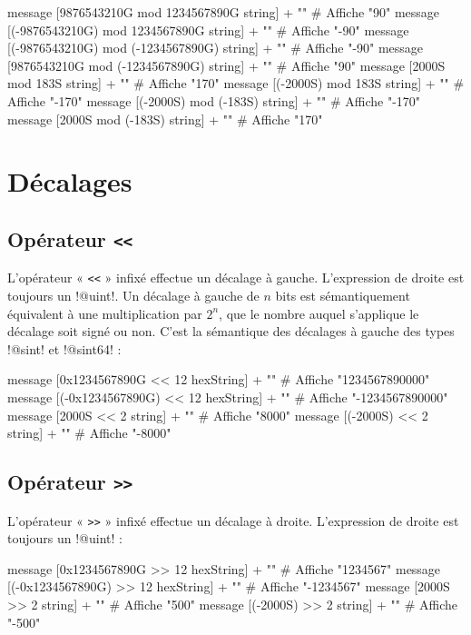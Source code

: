 \begin{galgas}
  message [9876543210G mod 1234567890G string] + "\n" # Affiche "90"
  message [(-9876543210G) mod 1234567890G string] + "\n" # Affiche "-90"
  message [(-9876543210G) mod (-1234567890G) string] + "\n"  # Affiche "-90"
  message [9876543210G mod (-1234567890G) string] + "\n"  # Affiche "90"
  message [2000S mod 183S string] + "\n" # Affiche "170"
  message [(-2000S) mod 183S string] + "\n" # Affiche "-170"
  message [(-2000S) mod (-183S) string] + "\n" # Affiche "-170"
  message [2000S mod (-183S) string] + "\n" # Affiche "170"
\end{galgas}










\section{Décalages}

\subsection{Opérateur \texttt{<{}<}}

L'opérateur « \texttt{<{}<} » infixé effectue un décalage à gauche. L'expression de droite est toujours un \ggs!@uint!. Un décalage à gauche de $n$ bits est sémantiquement équivalent à une multiplication par $2^n$, que le nombre auquel s'applique le décalage soit signé ou non. C'est la sémantique des décalages à gauche des types \ggs!@sint! et \ggs!@sint64! :

\begin{galgas}
  message [0x1234567890G << 12 hexString] + "\n" # Affiche "1234567890000"
  message [(-0x1234567890G) << 12 hexString] + "\n" # Affiche "-1234567890000"
  message [2000S << 2 string] + "\n" # Affiche "8000"
  message [(-2000S) << 2 string] + "\n" # Affiche "-8000"
\end{galgas}

\subsection{Opérateur \texttt{>{}>}}

L'opérateur « \texttt{>{}>} » infixé effectue un décalage à droite. L'expression de droite est toujours un \ggs!@uint! :
\begin{galgas}
  message [0x1234567890G >> 12 hexString] + "\n" # Affiche "1234567"
  message [(-0x1234567890G) >> 12 hexString] + "\n" # Affiche "-1234567"
  message [2000S >> 2 string] + "\n" # Affiche "500"
  message [(-2000S) >> 2 string] + "\n" # Affiche "-500"
\end{galgas}

